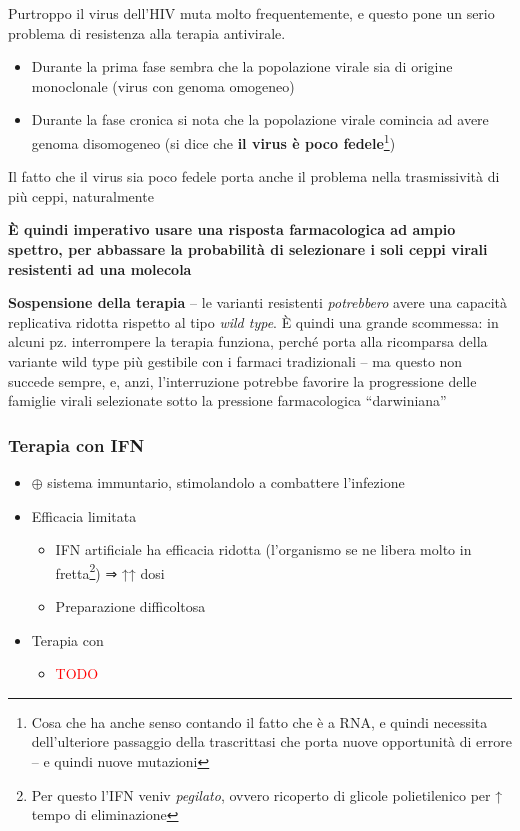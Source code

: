 \documentclass[italian,]{article}
\providecommand{\tightlist}{%
  \setlength{\itemsep}{0pt}\setlength{\parskip}{0pt}}
\newcommand{\far}[1]{ \fbox{\textsc{#1}} } %
\newcommand{\yellowbox}[2]{\begin{tcolorbox}[title=#1,colback=yellow!5,colframe=yellow!75!red, coltitle=black]#2\end{tcolorbox}} %
\newcommand{\att}[0]{ $\oplus$ }                                        %
\newcommand{\TODO}[1]{\textcolor{red}{\textsf{\footnotesize{TODO #1}}}} %
\begin{document}
\yellowbox{Resistenza di HIV1 ai farmaci}{
Purtroppo il virus dell'HIV muta molto frequentemente, e questo pone un
serio problema di resistenza alla terapia antivirale.

\begin{itemize}
\tightlist
\item
  Durante la prima fase sembra che la popolazione virale sia di origine
  monoclonale (virus con genoma omogeneo)
\item
  Durante la fase cronica si nota che la popolazione virale comincia ad
  avere genoma disomogeneo (si dice che \textbf{il virus è poco
  fedele}\footnote{Cosa che ha anche senso contando il fatto che è a
    RNA, e quindi necessita dell'ulteriore passaggio della trascrittasi
    che porta nuove opportunità di errore -- e quindi nuove mutazioni})
\end{itemize}

Il fatto che il virus sia poco fedele porta anche il problema nella
trasmissività di più ceppi, naturalmente

\textbf{È quindi imperativo usare una risposta farmacologica ad ampio
spettro, per abbassare la probabilità di selezionare i soli ceppi virali
resistenti ad una molecola}

\tcblower

\textbf{Sospensione della terapia} -- le varianti resistenti
\emph{potrebbero} avere una capacità replicativa ridotta rispetto al
tipo \emph{wild type}. È quindi una grande scommessa: in alcuni pz.
interrompere la terapia funziona, perché porta alla ricomparsa della
variante wild type più gestibile con i farmaci tradizionali -- ma questo
non succede sempre, e, anzi, l'interruzione potrebbe favorire la
progressione delle famiglie virali selezionate sotto la pressione
farmacologica ``darwiniana''
}

\hypertarget{terapia-con-ifn}{%
\subsubsection{Terapia con IFN}\label{terapia-con-ifn}}

\begin{itemize}
\tightlist
\item
  \att sistema immuntario, stimolandolo a combattere l'infezione
\item
  Efficacia limitata

  \begin{itemize}
  \tightlist
  \item
    IFN artificiale ha efficacia ridotta (l'organismo se ne libera molto
    in fretta\footnote{Per questo l'IFN veniv \emph{pegilato}, ovvero
      ricoperto di glicole polietilenico per ↑ tempo di eliminazione}) ⇒
    ↑↑ dosi
  \item
    Preparazione difficoltosa
  \end{itemize}
\item
  Terapia con \far{IFNα}

  \begin{itemize}
  \item
    \TODO{}
  \end{itemize}
\end{itemize}
\end{document}
